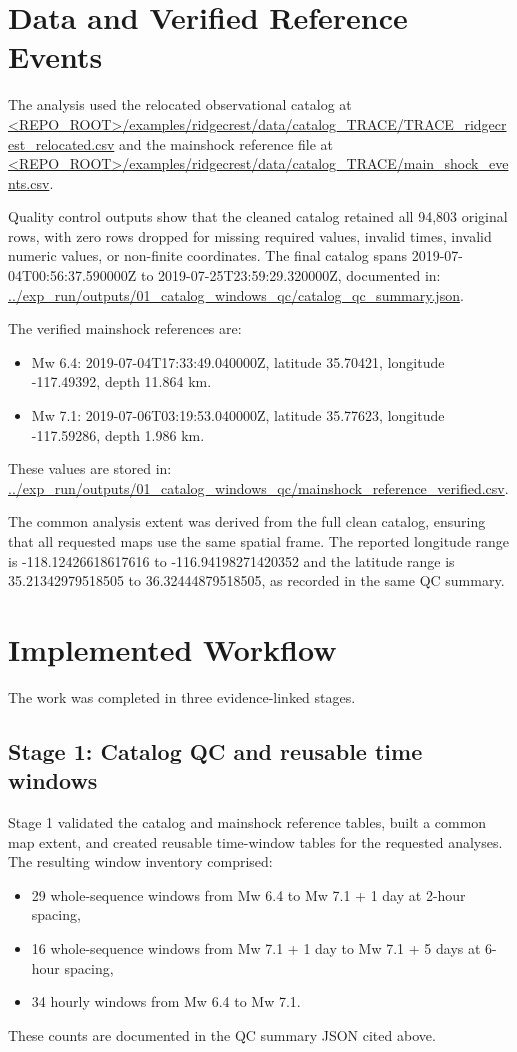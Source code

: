 \documentclass[11pt]{article}
\begin{document}
\section{Data and Verified Reference Events}
The analysis used the relocated observational catalog at
\url{<REPO_ROOT>/examples/ridgecrest/data/catalog_TRACE/TRACE_ridgecrest_relocated.csv}
and the mainshock reference file at
\url{<REPO_ROOT>/examples/ridgecrest/data/catalog_TRACE/main_shock_events.csv}.

Quality control outputs show that the cleaned catalog retained all 94{,}803 original rows, with zero rows dropped for missing required values, invalid times, invalid numeric values, or non-finite coordinates. The final catalog spans 2019-07-04T00:56:37.590000Z to 2019-07-25T23:59:29.320000Z, documented in:
\url{../exp_run/outputs/01_catalog_windows_qc/catalog_qc_summary.json}.

The verified mainshock references are:
\begin{itemize}[leftmargin=1.5em]
    \item Mw 6.4: 2019-07-04T17:33:49.040000Z, latitude 35.70421, longitude -117.49392, depth 11.864 km.
    \item Mw 7.1: 2019-07-06T03:19:53.040000Z, latitude 35.77623, longitude -117.59286, depth 1.986 km.
\end{itemize}
These values are stored in:
\url{../exp_run/outputs/01_catalog_windows_qc/mainshock_reference_verified.csv}.

The common analysis extent was derived from the full clean catalog, ensuring that all requested maps use the same spatial frame. The reported longitude range is -118.12426618617616 to -116.94198271420352 and the latitude range is 35.21342979518505 to 36.32444879518505, as recorded in the same QC summary.

\section{Implemented Workflow}
The work was completed in three evidence-linked stages.

\subsection{Stage 1: Catalog QC and reusable time windows}
Stage 1 validated the catalog and mainshock reference tables, built a common map extent, and created reusable time-window tables for the requested analyses. The resulting window inventory comprised:
\begin{itemize}[leftmargin=1.5em]
    \item 29 whole-sequence windows from Mw 6.4 to Mw 7.1 + 1 day at 2-hour spacing,
    \item 16 whole-sequence windows from Mw 7.1 + 1 day to Mw 7.1 + 5 days at 6-hour spacing,
    \item 34 hourly windows from Mw 6.4 to Mw 7.1.
\end{itemize}
These counts are documented in the QC summary JSON cited above.
\end{document}
